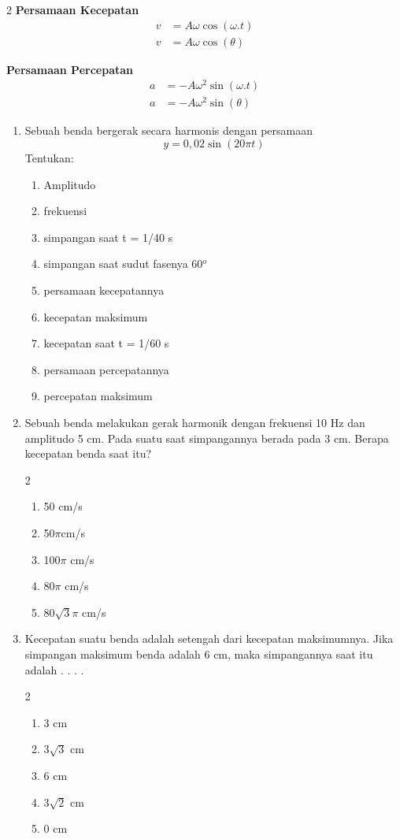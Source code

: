 \documentclass[10pt,a4paper]{extarticle}
\newcommand{\pilgani}[1]{                            \vspace{-0.3cm}\begin{multicols}{2}
 \begin{enumerate}[label=\Alph*., itemsep=0pt,topsep=0pt,leftmargin=*,align=Center]#1                     \end{enumerate}
 \phantom{ini cuma sapi, wedus, dan ayam}
 \end{multicols}}
\begin{document}
\begin{multicols*}{2}
\textbf{Persamaan Kecepatan}
\begin{align*}
v&=A\omega \cos(\omega.t)\\
v&=A\omega\cos(\theta)
\end{align*}

\textbf{Persamaan Percepatan}
\begin{align*}
a &= -A\omega^2\sin(\omega.t)\\
a &= -A\omega^2\sin(\theta)
\end{align*}



\begin{enumerate}
\item Sebuah benda bergerak secara harmonis dengan persamaan $$y = 0,02 \sin (20\pi t) $$
Tentukan:
\begin{enumerate}[noitemsep,label=\alph*.]
\item Amplitudo
\item frekuensi
\item simpangan saat t = 1/40 s
\item simpangan saat sudut fasenya 60$^o$
\item persamaan kecepatannya
\item kecepatan maksimum
\item kecepatan saat t = 1/60 s
\item persamaan percepatannya
\item percepatan maksimum
\end{enumerate}
\vspace{6cm}

\item Sebuah benda melakukan gerak harmonik dengan frekuensi 10 Hz dan amplitudo 5 cm. Pada suatu saat simpangannya berada pada 3 cm. Berapa kecepatan benda saat itu?
\pilgani{
\item 50 cm/s
\item 50$\pi$cm/s
\item 100$\pi$ cm/s
\item 80$\pi$ cm/s
\item 80$\sqrt{3}\pi$ cm/s
}
\vspace{3cm}

\item Kecepatan suatu benda adalah setengah dari kecepatan maksimumnya. Jika simpangan maksimum benda adalah 6 cm, maka simpangannya saat itu adalah . . . .
\pilgani{
\item 3 cm
\item 3$\sqrt{3}$ cm
\item 6 cm
\item 3$\sqrt{2}$ cm
\item 0 cm
}
\vspace{5cm}


\end{enumerate}
\end{multicols*}
\end{document}
